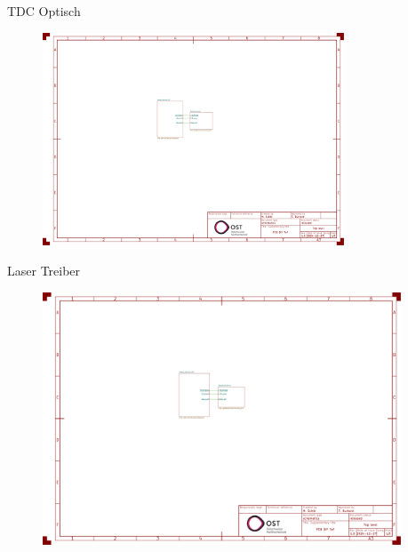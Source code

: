 \begin{frame}{TDC Optisch}
    \begin{figure}
        \includegraphics[page=2, trim=530 330 300 310, clip, width=0.8\textwidth]{../documentation/attachments/schematic.pdf}
    \end{figure}

    \iconoptical
\end{frame}

\begin{frame}{Laser Treiber}
    \begin{figure}
        \includegraphics[page=3, trim=100 520 550 60, clip, width=0.95\textwidth]{../documentation/attachments/schematic.pdf}
    \end{figure}

    \iconoptical
\end{frame}

